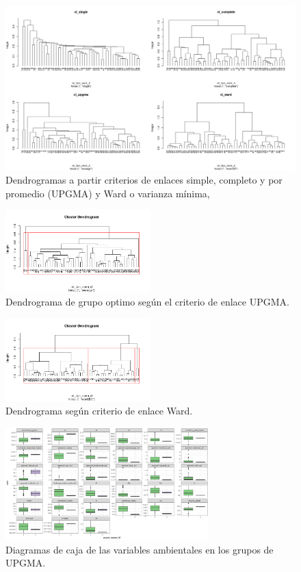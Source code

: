 \documentclass[11pt,]{article}
\begin{document}
\begin{figure}
\centering
\includegraphics[width=1.00000\textwidth]{meth_enl.png}
\caption{Dendrogramas a partir criterios de enlaces simple, completo y
por promedio (UPGMA) y Ward o varianza mínima,\label{fig:enlaces}}
\end{figure}

\begin{figure}
\centering
\includegraphics[width=0.50000\textwidth]{2UPGMA den.png}
\caption{Dendrograma de grupo optimo según el criterio de enlace
UPGMA.\label{fig:upgmaden}}
\end{figure}

\begin{figure}
\centering
\includegraphics[width=0.50000\textwidth]{ward_den.png}
\caption{Dendrograma según criterio de enlace Ward.\label{fig:wardden}}
\end{figure}

\begin{figure}
\centering
\includegraphics[width=0.70000\textwidth]{caja_upgma.png}
\caption{Diagramas de caja de las variables ambientales en los grupos de
UPGMA.\label{fig:upgma_caja}}
\end{figure}
\end{document}
